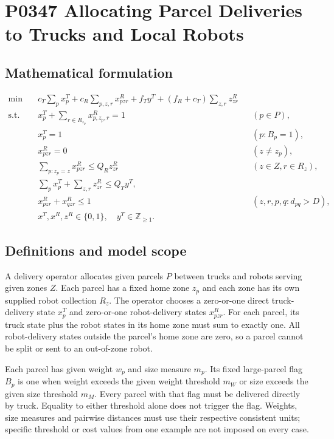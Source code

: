 \documentclass[10pt]{article}
\begin{document}
\section*{P0347 Allocating Parcel Deliveries to Trucks and Local Robots}
\subsection*{Mathematical formulation}
\begin{align*}
\min\quad &c_T\sum_px^T_p+c_R\sum_{p,z,r}x^R_{pzr}
+f_Ty^T+(f_R+c_T)\sum_{z,r}z^R_{zr}\\
\text{s.t.}\quad&
x^T_p+\sum_{r\in R_{z_p}}x^R_{p,z_p,r}=1&&(p\in P),\\
&x^T_p=1&&(p:B_p=1),\\
&x^R_{pzr}=0&&(z\ne z_p),\\
&\sum_{p:z_p=z}x^R_{pzr}\le Q_Rz^R_{zr}&&(z\in Z,r\in R_z),\\
&\sum_px^T_p+\sum_{z,r}z^R_{zr}\le Q_Ty^T,\\
&x^R_{pzr}+x^R_{qzr}\le1&&(z,r,p,q:d_{pq}>D),\\
&x^T,x^R,z^R\in\{0,1\},\quad y^T\in\mathbb Z_{\ge1}.
\end{align*}

\subsection*{Definitions and model scope}
A delivery operator allocates given parcels $P$ between trucks and robots serving given zones $Z$. Each parcel has a fixed home zone $z_p$ and each zone has its own supplied robot collection $R_z$. The operator chooses a zero-or-one direct truck-delivery state $x_p^T$ and zero-or-one robot-delivery states $x_{pzr}^R$. For each parcel, its truck state plus the robot states in its home zone must sum to exactly one. All robot-delivery states outside the parcel's home zone are zero, so a parcel cannot be split or sent to an out-of-zone robot.

Each parcel has given weight $w_p$ and size measure $m_p$. Its fixed large-parcel flag $B_p$ is one when weight exceeds the given weight threshold $m_W$ or size exceeds the given size threshold $m_M$. Every parcel with that flag must be delivered directly by truck. Equality to either threshold alone does not trigger the flag. Weights, size measures and pairwise distances must use their respective consistent units; specific threshold or cost values from one example are not imposed on every case.
\end{document}
